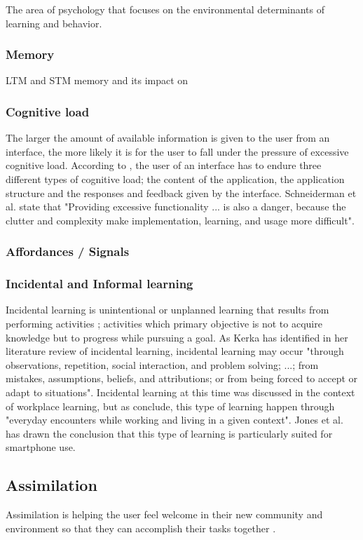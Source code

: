 The area of psychology that focuses on the environmental determinants of learning and behavior.

\subsubsection{Memory}
LTM and STM memory and its impact on
\subsubsection{Cognitive load}
The larger the amount of available information is given to the user from an interface, the more likely it is for the user to fall under the pressure of excessive cognitive load. According to \cite{Jih1992}, the user of an interface has to endure three different types of cognitive load; the content of the application, the application structure and the responses and feedback given by the interface. Schneiderman et al. state that "Providing excessive functionality ... is also a danger, because the clutter and complexity make implementation, learning, and usage more difficult".

\subsubsection{Affordances / Signals}

\subsubsection{Incidental and Informal learning}
Incidental learning is unintentional or unplanned learning that results from performing activities \cite{Kerka2000}; activities which primary objective is not to acquire knowledge but to progress while pursuing a goal. As Kerka \cite{Kerka2000} has identified in her literature review of incidental learning, incidental learning may occur "through observations, repetition, social interaction, and problem solving; ...; from mistakes, assumptions, beliefs, and attributions; or from being forced to accept or adapt to situations". Incidental learning at this time was discussed in the context of workplace learning, but as \cite{Marsick2001} conclude, this type of learning happen through "everyday encounters while working and living in a given context". Jones et al. \cite{Jones2014} has drawn the conclusion that this type of learning is particularly suited for smartphone use.

\subsection{Assimilation}
\label{sec:assimilation}
Assimilation is helping the user feel welcome in their new community and environment so that they can accomplish their tasks together \cite{Bradt2009}.

